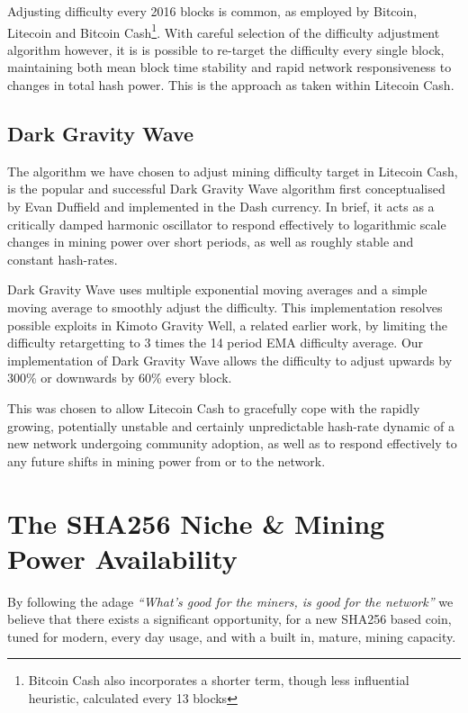 \documentclass{IOS-Book-Article}
\begin{document}
Adjusting difficulty every 2016 blocks is common, as employed by Bitcoin, Litecoin and Bitcoin Cash\footnote{Bitcoin Cash also
incorporates a shorter term, though less influential heuristic, calculated every 13 blocks}. With careful selection of the difficulty adjustment algorithm however, it is is possible to re-target the difficulty every
single block, maintaining both mean block time stability and rapid network responsiveness to changes in total hash power. This
is the approach as taken within Litecoin Cash.

\subsection{Dark Gravity Wave}

The algorithm we have chosen to adjust mining difficulty target in Litecoin Cash, is the popular and successful Dark Gravity Wave\cite{r6} algorithm
first conceptualised by Evan Duffield and implemented in the Dash currency. In brief, it acts as a critically damped harmonic oscillator to respond 
effectively to logarithmic scale changes in mining power over short periods, as well as roughly stable and constant
hash-rates.

Dark Gravity Wave uses multiple exponential moving averages and a simple moving average to smoothly adjust the difficulty. This implementation resolves possible exploits in Kimoto Gravity Well, a related earlier work, by limiting the difficulty retargetting to 3 times the 14 period EMA difficulty average. Our implementation of Dark Gravity Wave allows the difficulty to adjust upwards by 300\% or downwards by 60\% every block.

This was chosen to allow Litecoin Cash to gracefully cope with the rapidly growing, potentially unstable and certainly
unpredictable hash-rate dynamic of a new network undergoing community adoption, as well as to respond effectively 
to any future shifts in mining power from or to the network.

\section{The SHA256 Niche \& Mining Power Availability}

By following the adage \textit{``What's good for the miners, is good for the network''} we believe that there exists a 
significant opportunity, for a new SHA256 based coin, tuned for modern, every day usage, and with a built in, mature, mining
capacity.
\end{document}
